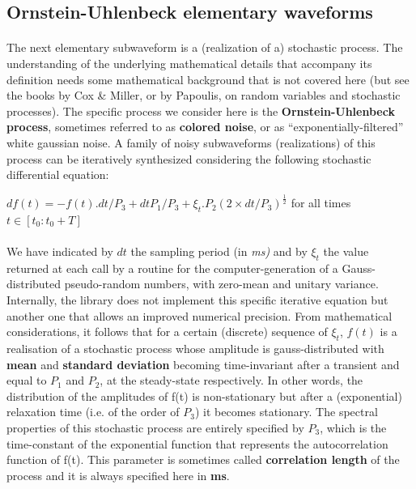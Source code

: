 \subsection{Ornstein-Uhlenbeck elementary waveforms}

\paragraph{}
The next elementary subwaveform is a (realization of a) stochastic process. The understanding of the underlying
mathematical details that accompany its definition needs some mathematical background that is not covered here (but see
the books by Cox \& Miller, or by Papoulis, on random variables and stochastic processes). The specific process we
consider here is the \textbf{Ornstein-Uhlenbeck process}, sometimes referred to as \textbf{colored noise}, or as
``exponentially-filtered'' white gaussian noise. A family of noisy subwaveforms (realizations) of this process can be
iteratively synthesized considering the following stochastic differential equation:

\begin{center}
$ df(t) = -f(t).dt/P_3 + dt P_1/P_3 + \xi_{t}.P_{2}(2\times dt/P_3)^{\frac{1}{2}}$ for all times $t \in [t_0:t_0 + T]$
\end{center}

\paragraph{}
We have indicated by $dt$ the sampling period (in \textit{ms)} and by $\xi_{t} $ the value returned
at each call by a routine for the computer-generation of a Gauss-distributed pseudo-random numbers, with zero-mean and
unitary variance. Internally, the library does not implement this specific iterative equation but another one that
allows an improved numerical precision. From mathematical considerations, it follows that for a certain (discrete)
sequence of $\xi_{t}$, $f(t)$ is a realisation of a stochastic process whose amplitude is gauss-distributed
with \textbf{mean} and \textbf{standard deviation} becoming time-invariant after a transient and equal to
\textbf{$P_1$} and \textbf{$P_2$}, at the steady-state respectively. In other words, the
distribution of the amplitudes of f(t) is non-stationary but after a (exponential) relaxation time (i.e. of the order
of \textbf{$P_3$}) it becomes stationary. The spectral properties of this
stochastic process are entirely specified by \textbf{$P_3$}, which is the
time-constant of the exponential function that represents the autocorrelation function of f(t). This parameter is
sometimes called \textbf{correlation length} of the process and it is always specified here in \textbf{ms}. 

